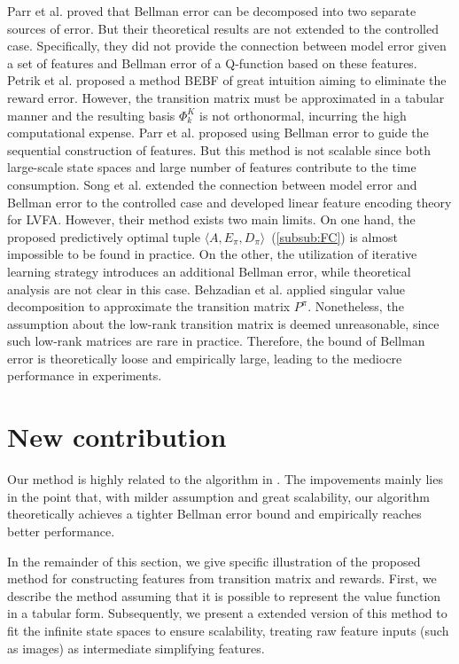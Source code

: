 \documentclass[onecolumn, conference]{IEEEtran}
\begin{document}
Parr et al. \cite{Parr2008AnAO} proved that Bellman error can be decomposed into two separate sources of error. But their theoretical results are not extended to the controlled case. Specifically, they did not provide the connection between model 
error given a set of features and Bellman error of a Q-function based on these features. Petrik et al. \cite{Petrik2007AnAO} proposed a method BEBF of great intuition aiming to eliminate the reward error. However, the transition matrix must be approximated in a tabular manner and the resulting basis ${\Phi_k^K}$ is not orthonormal, incurring the high computational expense. Parr et al. \cite{Parr2007AnalyzingFG} proposed using Bellman error to guide the sequential construction of features. But this method is not scalable since both large-scale state spaces and large number of features 
contribute to the time consumption.
Song et al. \cite{Song2016LinearFE} extended the connection between model error and Bellman error to the controlled case and developed linear feature encoding theory for LVFA. However, their method exists two main limits. On one hand, the proposed predictively optimal tuple $\langle A,E_\pi,D_\pi\rangle$~(\ref{subsub:FC}) is almost impossible to be found in practice. On the other, the utilization of iterative learning strategy introduces an additional Bellman error, while theoretical analysis are not clear in this case. Behzadian et al. \cite{Behzadian2019FeatureSB} applied singular value decomposition to approximate the transition matrix $P^\pi$. Nonetheless, the assumption about the low-rank transition matrix is deemed unreasonable, since such low-rank matrices are rare in practice. Therefore, the bound of Bellman error is theoretically loose and empirically large, leading to the mediocre performance in experiments.
\section{New contribution}\label{sec:contribution}


Our method is highly related to the algorithm in \cite{Song2016LinearFE}\cite{Behzadian2019FeatureSB}. The impovements mainly lies in the point that, with milder assumption and great scalability, our algorithm theoretically achieves a tighter Bellman error bound and empirically reaches better performance. 

In the remainder of this section, we give specific illustration of the proposed method for constructing features from transition matrix and rewards. First, we describe the method assuming that it is possible to represent the value function in a tabular form. Subsequently, we present a extended version of this method to fit the infinite state spaces to ensure scalability, treating raw feature inputs (such as images) as intermediate simplifying features.
\end{document}
